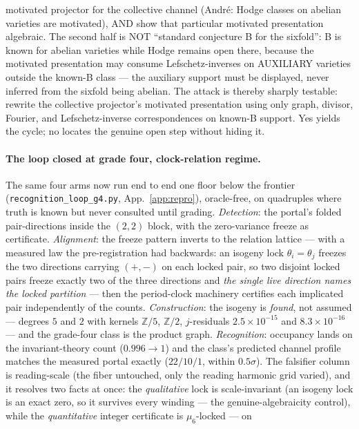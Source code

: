 \documentclass[11pt]{article}
\theoremstyle{definition}
\theoremstyle{remark}
\begin{document}
motivated projector for the collective channel (Andr\'e: Hodge classes on
abelian varieties are motivated), AND show that particular motivated
presentation algebraic.  The second half is NOT ``standard conjecture B
for the sixfold'': B is known for abelian varieties while Hodge remains
open there, because the motivated presentation may consume
Lefschetz-inverses on AUXILIARY varieties outside the known-B class ---
the auxiliary support must be displayed, never inferred from the sixfold
being abelian.  The attack is thereby sharply testable: rewrite the
collective projector's motivated presentation using only graph, divisor,
Fourier, and Lefschetz-inverse correspondences on known-B support.  Yes
yields the cycle; no locates the genuine open step without hiding it.

\paragraph{The loop closed at grade four, clock-relation regime.} The same
four arms now run end to end one floor below the frontier
(\texttt{recognition\_loop\_g4.py}, App.~\ref{app:repro}), oracle-free, on
quadruples where truth is known but never consulted until grading.
\emph{Detection}: the portal's folded pair-directions inside the $(2,2)$
block, with the zero-variance freeze as certificate. \emph{Alignment}: the
freeze pattern inverts to the relation lattice --- with a measured law the
pre-registration had backwards: an isogeny lock $\theta_i=\theta_j$ freezes
the two directions carrying $(+,-)$ on each locked pair, so two disjoint
locked pairs freeze exactly two of the three directions and \emph{the single
live direction names the locked partition} --- then the period-clock
machinery certifies each implicated pair independently of the counts.
\emph{Construction}: the isogeny is \emph{found}, not assumed --- degrees
$5$ and $2$ with kernels $\mathbb Z/5$, $\mathbb Z/2$, $j$-residuals
$2.5\times10^{-15}$ and $8.3\times10^{-16}$ --- and the grade-four class is
the product graph. \emph{Recognition}: occupancy lands on the
invariant-theory count ($0.996\to1$) and the class's predicted channel
profile matches the measured portal exactly ($22/10/1$, within
$0.5\sigma$). The falsifier column is reading-scale (the fiber untouched,
only the reading harmonic grid varied), and it resolves two facts at once:
the \emph{qualitative} lock is scale-invariant (an isogeny lock is an exact
zero, so it survives every winding --- the genuine-algebraicity control),
while the \emph{quantitative} integer certificate is $\mu_6$-locked --- on
\end{document}
